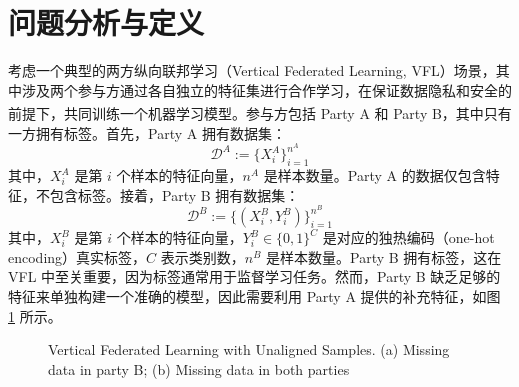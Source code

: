 \section{问题分析与定义}
考虑一个典型的两方纵向联邦学习（Vertical Federated Learning, VFL）场景，其中涉及两个参与方通过各自独立的特征集进行合作学习，在保证数据隐私和安全的前提下，共同训练一个机器学习模型\textsuperscript{\cite{yang2019federated}}。参与方包括 Party A 和 Party B，其中只有一方拥有标签。首先，Party A 拥有数据集：
\begin{equation}
	\mathcal{D}^A := \{X^A_i\}_{i=1}^{n^A}
\end{equation}
其中，$X^A_i$ 是第 $i$ 个样本的特征向量，$n^A$ 是样本数量。Party A 的数据仅包含特征，不包含标签。接着，Party B 拥有数据集：
\begin{equation}
	\mathcal{D}^B := \{(X^B_i, Y^B_i)\}_{i=1}^{n^B}
\end{equation}
其中，$X^B_i$ 是第 $i$ 个样本的特征向量，$Y^B_i \in \{0,1\}^C$ 是对应的独热编码（one-hot encoding）真实标签，$C$ 表示类别数，$n^B$ 是样本数量。Party B 拥有标签，这在 VFL 中至关重要，因为标签通常用于监督学习任务。然而，Party B 缺乏足够的特征来单独构建一个准确的模型，因此需要利用 Party A 提供的补充特征，如图 \ref{fig:Missing} 所示。
\vspace{-0.1cm}
\begin{figure}[!h]
	\centering
	\hspace{0.01\textwidth}  %
	
	{\centering \wuhao Vertical Federated Learning with Unaligned Samples. (a) Missing data in party B; (b) Missing data in both parties}    
	\label{fig:Missing}
\end{figure}
\vspace{-0.35cm}

